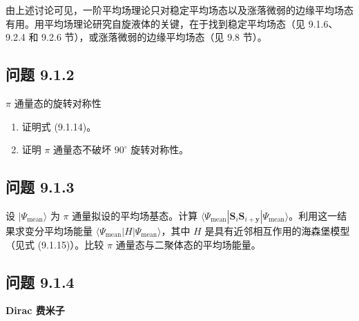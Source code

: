 由上述讨论可见，一阶平均场理论只对稳定平均场态以及涨落微弱的边缘平均场态有用。用平均场理论研究自旋液体的关键，在于找到稳定平均场态（见 9.1.6、9.2.4 和 9.2.6 节），或涨落微弱的边缘平均场态（见 9.8 节）。

\subsection*{问题 9.1.2}

$\pi$ 通量态的旋转对称性

\begin{enumerate}
\item 证明式 (9.1.14)。
\item 证明 $\pi$ 通量态不破坏 $90^{\circ}$ 旋转对称性。
\end{enumerate}


\subsection*{问题 9.1.3}

设 $|\Psi_{\text{mean}}\rangle$ 为 $\pi$ 通量拟设的平均场基态。计算 $\langle\Psi_{\text{mean}}|\pmb{S}_i\pmb{S}_{i+\pmb{y}}|\Psi_{\text{mean}}\rangle$。利用这一结果求变分平均场能量 $\langle\Psi_{\text{mean}}|H|\Psi_{\text{mean}}\rangle$，其中 $H$ 是具有近邻相互作用的海森堡模型（见式 (9.1.15)）。比较 $\pi$ 通量态与二聚体态的平均场能量。

\subsection*{问题 9.1.4}

\textbf{Dirac 费米子}

